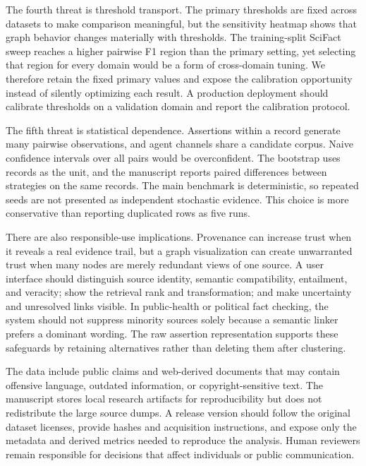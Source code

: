 \documentclass{ieeeaccess}
\begin{document}
The fourth threat is threshold transport. The primary thresholds are fixed across datasets to make comparison meaningful, but the sensitivity heatmap shows that graph behavior changes materially with thresholds. The training-split SciFact sweep reaches a higher pairwise F1 region than the primary setting, yet selecting that region for every domain would be a form of cross-domain tuning. We therefore retain the fixed primary values and expose the calibration opportunity instead of silently optimizing each result. A production deployment should calibrate thresholds on a validation domain and report the calibration protocol.

The fifth threat is statistical dependence. Assertions within a record generate many pairwise observations, and agent channels share a candidate corpus. Naive confidence intervals over all pairs would be overconfident. The bootstrap uses records as the unit, and the manuscript reports paired differences between strategies on the same records. The main benchmark is deterministic, so repeated seeds are not presented as independent stochastic evidence. This choice is more conservative than reporting duplicated rows as five runs.

There are also responsible-use implications. Provenance can increase trust when it reveals a real evidence trail, but a graph visualization can create unwarranted trust when many nodes are merely redundant views of one source. A user interface should distinguish source identity, semantic compatibility, entailment, and veracity; show the retrieval rank and transformation; and make uncertainty and unresolved links visible. In public-health or political fact checking, the system should not suppress minority sources solely because a semantic linker prefers a dominant wording. The raw assertion representation supports these safeguards by retaining alternatives rather than deleting them after clustering.

The data include public claims and web-derived documents that may contain offensive language, outdated information, or copyright-sensitive text. The manuscript stores local research artifacts for reproducibility but does not redistribute the large source dumps. A release version should follow the original dataset licenses, provide hashes and acquisition instructions, and expose only the metadata and derived metrics needed to reproduce the analysis. Human reviewers remain responsible for decisions that affect individuals or public communication.
\end{document}
